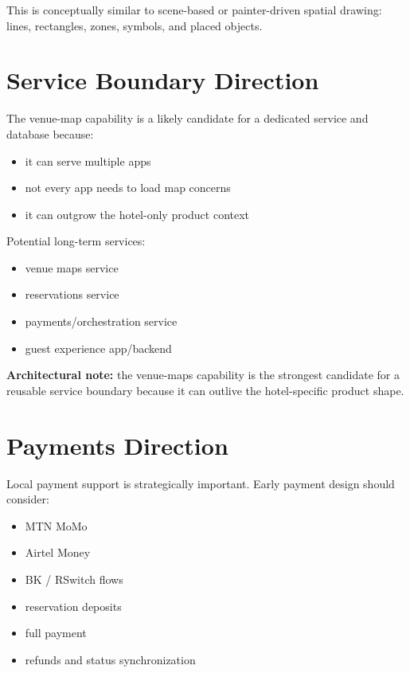\documentclass[11pt,a4paper]{article}
\begin{document}
This is conceptually similar to scene-based or painter-driven spatial drawing: lines, rectangles, zones, symbols, and placed objects.

\section{Service Boundary Direction}

The venue-map capability is a likely candidate for a dedicated service and database because:
\begin{itemize}
    \item it can serve multiple apps
    \item not every app needs to load map concerns
    \item it can outgrow the hotel-only product context
\end{itemize}

Potential long-term services:
\begin{itemize}
    \item venue maps service
    \item reservations service
    \item payments/orchestration service
    \item guest experience app/backend
\end{itemize}

\begin{kazehighlightbox}
\textbf{Architectural note:} the venue-maps capability is the strongest candidate for a reusable service boundary because it can outlive the hotel-specific product shape.
\end{kazehighlightbox}

\section{Payments Direction}

Local payment support is strategically important. Early payment design should consider:
\begin{itemize}
    \item MTN MoMo
    \item Airtel Money
    \item BK / RSwitch flows
    \item reservation deposits
    \item full payment
    \item refunds and status synchronization
\end{itemize}
\end{document}
